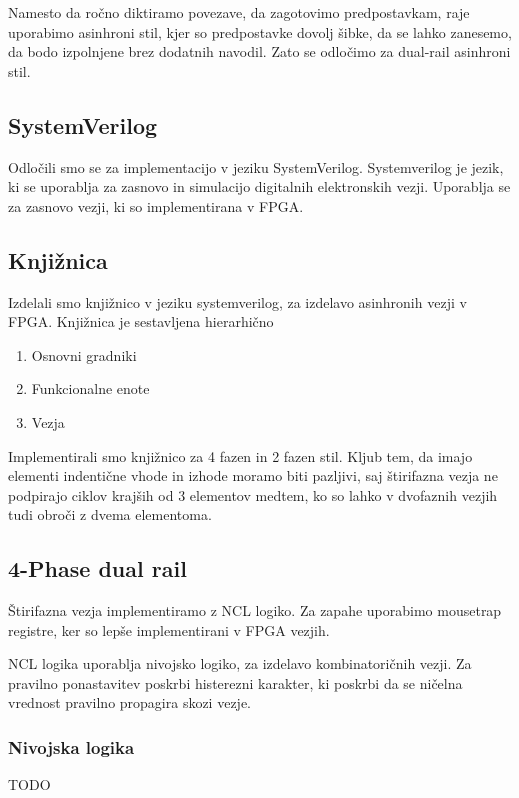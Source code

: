 Namesto da ročno diktiramo povezave, da zagotovimo predpostavkam, raje uporabimo asinhroni stil, kjer so predpostavke dovolj šibke, da se lahko zanesemo, da bodo izpolnjene brez dodatnih navodil.
Zato se odločimo za dual-rail asinhroni stil. 


\subsection{SystemVerilog} \label{b}
Odločili smo se za implementacijo v jeziku SystemVerilog. Systemverilog je jezik, ki se uporablja za zasnovo in simulacijo digitalnih elektronskih vezji. Uporablja se za zasnovo vezji, ki so implementirana v FPGA.


\subsection{Knjižnica} \label{b}
Izdelali smo knjižnico v jeziku systemverilog, za izdelavo asinhronih vezji v FPGA. Knjižnica je sestavljena hierarhično

\begin{enumerate}
	\item Osnovni gradniki
	\item Funkcionalne enote
	\item Vezja
\end{enumerate}

Implementirali smo knjižnico za 4 fazen in 2 fazen stil. Kljub tem, da imajo elementi indentične vhode in izhode moramo biti pazljivi, saj štirifazna vezja ne podpirajo ciklov krajših od 3 elementov medtem, ko so lahko v dvofaznih vezjih tudi obroči z dvema elementoma.


\subsection{4-Phase dual rail} \label{b}
Štirifazna vezja implementiramo z NCL logiko. Za zapahe uporabimo mousetrap registre, ker so lepše implementirani v FPGA vezjih.

NCL logika uporablja nivojsko logiko, za izdelavo kombinatoričnih vezji. Za pravilno ponastavitev poskrbi histerezni karakter, ki poskrbi da se ničelna vrednost pravilno propagira skozi vezje.

\subsubsection{Nivojska logika} \label{c}
TODO



